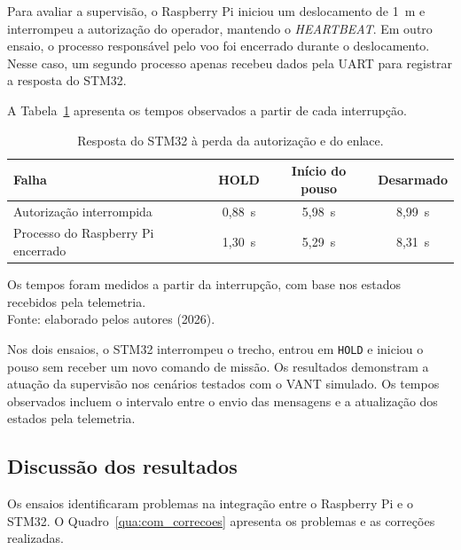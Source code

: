 Para avaliar a supervisão, o Raspberry Pi iniciou um deslocamento de 1~m e interrompeu a autorização do operador, mantendo o \textit{HEARTBEAT}. Em outro ensaio, o processo responsável pelo voo foi encerrado durante o deslocamento. Nesse caso, um segundo processo apenas recebeu dados pela UART para registrar a resposta do STM32.

A Tabela~\ref{tab:com_failsafe} apresenta os tempos observados a partir de cada interrupção.

\begin{table}[H]
    \centering
    \caption{Resposta do STM32 à perda da autorização e do enlace.}
    \label{tab:com_failsafe}
    \small
    \renewcommand{\arraystretch}{1.2}
    \begin{tabular}{lccc}
        \hline
        \textbf{Falha} & \textbf{HOLD} & \textbf{Início do pouso} & \textbf{Desarmado} \\
        \hline
        Autorização interrompida & 0,88~s & 5,98~s & 8,99~s \\
        Processo do Raspberry Pi encerrado & 1,30~s & 5,29~s & 8,31~s \\
        \hline
    \end{tabular}
    \par\vspace{0.15cm}
    \footnotesize Os tempos foram medidos a partir da interrupção, com base nos estados recebidos pela telemetria.\\
    Fonte: elaborado pelos autores (2026).
\end{table}

Nos dois ensaios, o STM32 interrompeu o trecho, entrou em \texttt{HOLD} e iniciou o pouso sem receber um novo comando de missão. Os resultados demonstram a atuação da supervisão nos cenários testados com o VANT simulado. Os tempos observados incluem o intervalo entre o envio das mensagens e a atualização dos estados pela telemetria.

\subsection{Discussão dos resultados}\label{subsec:res_com_discussao}

Os ensaios identificaram problemas na integração entre o Raspberry Pi e o STM32. O Quadro~\ref{qua:com_correcoes} apresenta os problemas e as correções realizadas.

